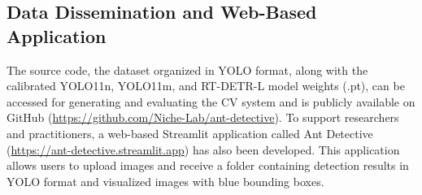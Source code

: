 
\subsection{Data Dissemination and Web-Based Application}

The source code, the dataset organized in YOLO format, along with the calibrated YOLO11n, YOLO11m, and RT-DETR-L model weights (.pt), can be accessed for generating and evaluating the CV system and is publicly available on GitHub (\url{https://github.com/Niche-Lab/ant-detective}). To support researchers and practitioners, a web-based Streamlit application called Ant Detective (\url{https://ant-detective.streamlit.app}) has also been developed. This application allows users to upload images and receive a folder containing detection results in YOLO format and visualized images with blue bounding boxes.
